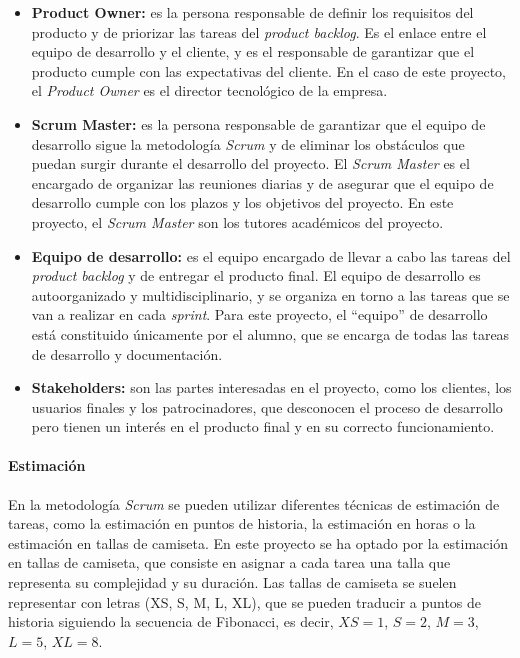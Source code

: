 \begin{itemize}
	\item \textbf{Product Owner:} es la persona responsable de definir los
		requisitos del producto y de priorizar las tareas del
		\textit{product backlog}. Es el enlace entre el equipo de desarrollo y
		el cliente, y es el responsable de garantizar que el producto cumple con
		las expectativas del cliente. En el caso de este proyecto, el
		\textit{Product Owner} es el director tecnológico de la empresa.
	\item \textbf{Scrum Master:} es la persona responsable de garantizar que el
		equipo de desarrollo sigue la metodología \textit{Scrum} y de eliminar
		los obstáculos que puedan surgir durante el desarrollo del proyecto. El
		\textit{Scrum Master} es el encargado de organizar las reuniones diarias
		y de asegurar que el equipo de desarrollo cumple con los plazos y los
		objetivos del proyecto. En este proyecto, el \textit{Scrum Master} son
		los tutores académicos del proyecto.
	\item \textbf{Equipo de desarrollo:} es el equipo encargado de llevar a cabo
		las tareas del \textit{product backlog} y de entregar el producto final.
		El equipo de desarrollo es autoorganizado y multidisciplinario, y se
		organiza en torno a las tareas que se van a realizar en cada
		\textit{sprint}. Para este proyecto, el ``equipo'' de desarrollo está
		constituido únicamente por el alumno, que se encarga de todas las tareas
		de desarrollo y documentación.
	\item \textbf{Stakeholders:} son las partes interesadas en el proyecto, como
		los clientes, los usuarios finales y los patrocinadores, que desconocen
		el proceso de desarrollo pero tienen un interés en el producto final y
		en su correcto funcionamiento.
\end{itemize}

\paragraph{Estimación}
En la metodología \textit{Scrum} se pueden utilizar diferentes técnicas de
estimación de tareas, como la estimación en puntos de historia, la estimación en
horas o la estimación en tallas de camiseta. En este proyecto se ha optado por
la estimación en tallas de camiseta, que consiste en asignar a cada tarea una
talla que representa su complejidad y su duración. Las tallas de camiseta se
suelen representar con letras (XS, S, M, L, XL), que se pueden traducir a puntos
de historia siguiendo la secuencia de Fibonacci, es decir, $XS = 1$, $S = 2$,
$M = 3$, $L = 5$, $XL = 8$.

